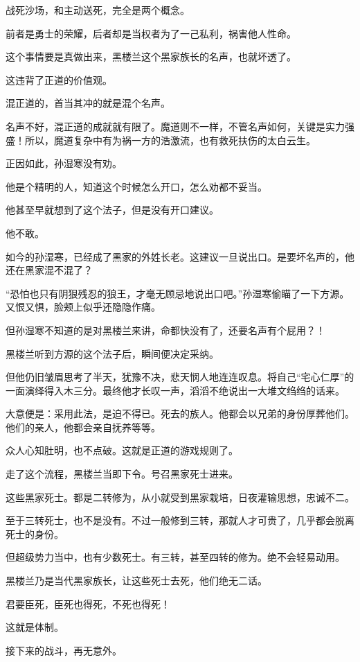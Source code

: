 \begin{this_body}
战死沙场，和主动送死，完全是两个概念。

前者是勇士的荣耀，后者却是当权者为了一己私利，祸害他人性命。

这个事情要是真做出来，黑楼兰这个黑家族长的名声，也就坏透了。

这违背了正道的价值观。

混正道的，首当其冲的就是混个名声。

名声不好，混正道的成就就有限了。魔道则不一样，不管名声如何，关键是实力强盛！所以，魔道复杂中有为祸一方的浩激流，也有救死扶伤的太白云生。

正因如此，孙湿寒没有劝。

他是个精明的人，知道这个时候怎么开口，怎么劝都不妥当。

他甚至早就想到了这个法子，但是没有开口建议。

他不敢。

如今的孙湿寒，已经成了黑家的外姓长老。这建议一旦说出口。是要坏名声的，他还在黑家混不混了？

“恐怕也只有阴狠残忍的狼王，才毫无顾忌地说出口吧。”孙湿寒偷瞄了一下方源。又恨又惧，脸颊上似乎还隐隐作痛。

但孙湿寒不知道的是对黑楼兰来讲，命都快没有了，还要名声有个屁用？！

黑楼兰听到方源的这个法子后，瞬间便决定采纳。

但他仍旧皱眉思考了半天，犹豫不决，悲天悯人地连连叹息。将自己“宅心仁厚”的一面演绎得入木三分。最终他才长叹一声，滔滔不绝说出一大堆文绉绉的话来。

大意便是：采用此法，是迫不得已。死去的族人。他都会以兄弟的身份厚葬他们。他们的亲人，他都会亲自抚养等等。

众人心知肚明，也不点破。这就是正道的游戏规则了。

走了这个流程，黑楼兰当即下令。号召黑家死士进来。

这些黑家死士。都是二转修为，从小就受到黑家栽培，日夜灌输思想，忠诚不二。

至于三转死士，也不是没有。不过一般修到三转，那就人才可贵了，几乎都会脱离死士的身份。

但超级势力当中，也有少数死士。有三转，甚至四转的修为。绝不会轻易动用。

黑楼兰乃是当代黑家族长，让这些死士去死，他们绝无二话。

君要臣死，臣死也得死，不死也得死！

这就是体制。

接下来的战斗，再无意外。


\end{this_body}
